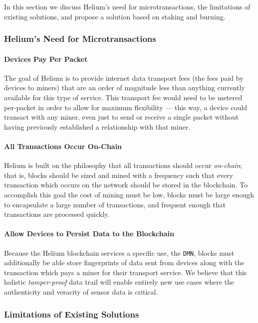 \documentclass[10pt, nonatbib, nocopyrightspace, reprint]{sigplanconf}
\begin{document}
In this section we discuss Helium's need for microtransactions, the limitations of existing solutions, and propose a solution based on staking and burning.

\subsubsection{Helium's Need for Microtransactions}

\paragraph{Devices Pay Per Packet}
The goal of Helium is to provide internet data transport fees (the fees paid by devices to miners) that are an order of magnitude less than anything currently available for this type of service. This transport fee would need to be metered per-packet in order to allow for maximum flexibility --- this way, a device could transact with any miner, even just to send or receive a single packet without having previously established a relationship with that miner.

\paragraph{All Transactions Occur On-Chain}
Helium is built on the philosophy that all transactions should occur \emph{on-chain}; that is, blocks should be sized and mined with a frequency such that every transaction which occurs on the network should be stored in the blockchain.  To accomplish this goal the cost of mining must be low, blocks must be large enough to encapsulate a large number of transactions, and frequent enough that transactions are processed quickly.

\paragraph{Allow Devices to Persist Data to the Blockchain}
Because the Helium blockchain services a specific use, the \verb|DMN|, blocks must additionally be able store fingerprints of data sent from devices along with the transaction which pays a miner for their transport service.  We believe that this holistic \emph{tamper-proof} data trail will enable entirely new use cases where the authenticity and veracity of sensor data is critical.

\subsubsection{Limitations of Existing Solutions}
\end{document}
